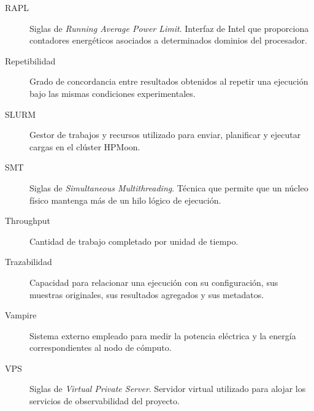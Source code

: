 \begin{description}
    \item[RAPL]
    Siglas de \textit{Running Average Power Limit}. Interfaz de Intel que proporciona contadores energéticos asociados a determinados dominios del procesador.

    \item[Repetibilidad]
    Grado de concordancia entre resultados obtenidos al repetir una ejecución bajo las mismas condiciones experimentales.

    \item[SLURM]
    Gestor de trabajos y recursos utilizado para enviar, planificar y ejecutar cargas en el clúster HPMoon.

    \item[SMT]
    Siglas de \textit{Simultaneous Multithreading}. Técnica que permite que un núcleo físico mantenga más de un hilo lógico de ejecución.

    \item[Throughput]
    Cantidad de trabajo completado por unidad de tiempo.

    \item[Trazabilidad]
    Capacidad para relacionar una ejecución con su configuración, sus muestras originales, sus resultados agregados y sus metadatos.

    \item[Vampire]
    Sistema externo empleado para medir la potencia eléctrica y la energía correspondientes al nodo de cómputo.

    \item[VPS]
    Siglas de \textit{Virtual Private Server}. Servidor virtual utilizado para alojar los servicios de observabilidad del proyecto.

\end{description}

\clearpage